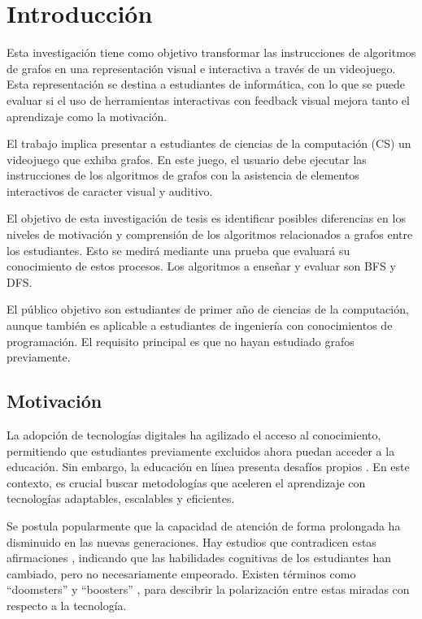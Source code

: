\chapter{Introducción}

Esta investigación tiene como objetivo transformar las instrucciones de algoritmos de grafos en una representación visual e interactiva a través de un videojuego. Esta representación se destina a estudiantes de informática, con lo que se puede evaluar si el uso de herramientas interactivas con feedback visual mejora tanto el aprendizaje como la motivación.

El trabajo implica presentar a estudiantes de ciencias de la computación (CS) un videojuego que exhiba grafos. En este juego, el usuario debe ejecutar las instrucciones de los algoritmos de grafos con la asistencia de elementos interactivos de caracter visual y auditivo.

El objetivo de esta investigación de tesis es identificar posibles diferencias en los niveles de motivación y comprensión de los algoritmos relacionados a grafos entre los estudiantes. Esto se medirá mediante una prueba que evaluará su conocimiento de estos procesos. Los algoritmos a enseñar y evaluar son BFS y DFS.

El público objetivo son estudiantes de primer año de ciencias de la computación, aunque también es aplicable a estudiantes de ingeniería con conocimientos de programación. El requisito principal es que no hayan estudiado grafos previamente.

\section{Motivación}

La adopción de tecnologías digitales ha agilizado el acceso al conocimiento, permitiendo que estudiantes previamente excluidos ahora puedan acceder a la educación. Sin embargo, la educación en línea presenta desafíos propios \cite{UN2023ImpactDigitalTechnologies}. En este contexto, es crucial buscar metodologías que aceleren el aprendizaje con tecnologías adaptables, escalables y eficientes.

Se postula popularmente que la capacidad de atención de forma prolongada ha disminuido en las nuevas generaciones. Hay estudios que contradicen estas afirmaciones \cite{The_Role_of_Attention_Learning_Digital_Age}, indicando que las habilidades cognitivas de los estudiantes han cambiado, pero no necesariamente empeorado. Existen términos como ``doomsters'' y ``boosters'' \cite{Selwyn2014LookingF}, para descibrir la polarización entre estas miradas con respecto a la tecnología.

